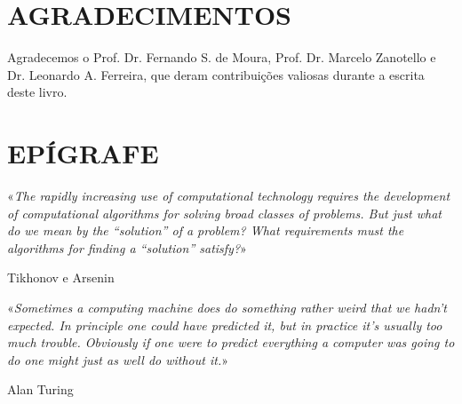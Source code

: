 \newpage
\thispagestyle{empty}
\section*{\centering AGRADECIMENTOS}

\vfill

Agradecemos o Prof. Dr. Fernando S. de Moura, Prof. Dr. Marcelo Zanotello e Dr. Leonardo A. Ferreira, que deram contribuições valiosas durante a escrita deste livro.  

\vfill

\newpage
 \section*{\centering EPÍGRAFE}\label{part0epi}

\vfill

\epigraph{«\textit{The rapidly increasing use of computational technology requires the development of computational algorithms for solving broad classes of problems. But just what do we mean by the ``solution'' of a problem? What requirements must the algorithms for finding a ``solution'' satisfy?}»}{Tikhonov e Arsenin \cite[Pág. 1]{tikhonov1977solutions}}


\vspace{2cm}


\epigraph{«\textit{Sometimes a computing machine does do something rather weird that we hadn’t expected. In principle one could have predicted it, but in practice it’s usually too much trouble. Obviously if one were to predict everything a computer was going to do one might just as well do without it.}»}{Alan Turing \cite{Turing2004}}


\vfill

\newpage
\renewcommand{\listfigurename}{LISTA DE FIGURAS}
\listoffigures
\renewcommand{\listtablename}{LISTA DE TABELAS}
\listoftables
 
\newpage
